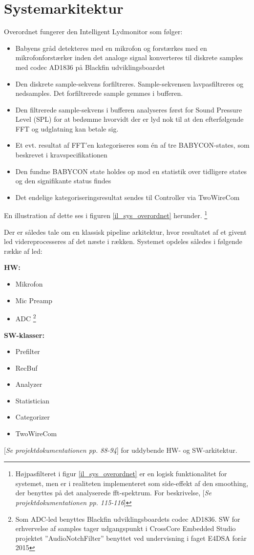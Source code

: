 \section{Systemarkitektur}

Overordnet fungerer den Intelligent Lydmonitor som følger:
\begin{itemize}
	\item Babyens gråd detekteres med en mikrofon og forstærkes med en mikrofonforstærker inden det analoge signal konverteres til diskrete samples med codec AD1836 på Blackfin udviklingsboardet
	\item Den diskrete sample-sekvens forfiltreres. Sample-sekvensen lavpasfiltreres og nedsamples. Det forfiltrerede sample gemmes i bufferen.
	\item Den filtrerede sample-sekvens i bufferen analyseres først for Sound Pressure Level (SPL) for at bedømme hvorvidt der er lyd nok til at den efterfølgende FFT og udglatning kan betale sig. 
	\item Et evt. resultat af FFT'en kategoriseres som én af tre BABYCON-states, som beskrevet i kravspecifikationen 
	\item Den fundne BABYCON state holdes op mod en statistik over tidligere states og den signifikante status findes
	\item Det endelige kategoriseringsresultat sendes til Controller via TwoWireCom
\end{itemize}
En illustration af dette ses i figuren \ref{il_sys_overordnet} herunder. \footnote{Højpasfilteret i figur \ref{il_sys_overordnet} er en logisk funktionalitet for systemet, men er i realiteten implementeret som side-effekt af den smoothing, der benyttes på det analyserede fft-spektrum. For beskrivelse, [\textit{Se projektdokumentationen pp. 115-116}]}


Der er således tale om en klassisk pipeline arkitektur, hvor resultatet af et givent led videreprocesseres af det næste i rækken.
Systemet opdeles således i følgende række af led:

\textbf{HW:} 
\begin{itemize}
\item Mikrofon
\item Mic Preamp
\item ADC \footnote{Som ADC-led benyttes Blackfin udviklingsboardets codec AD1836. SW for erhvervelse af samples tager udgangspunkt i CrossCore Embedded Studio projektet ''AudioNotchFilter'' benyttet ved undervisning i faget E4DSA forår 2015}
\end{itemize}

\textbf{SW-klasser:} 
\begin{itemize}
\item Prefilter
\item RecBuf
\item Analyzer
\item Statistician
\item Categorizer
\item TwoWireCom
\end{itemize}
[\textit{Se projektdokumentationen pp. 88-94}] for uddybende HW- og SW-arkitektur.
